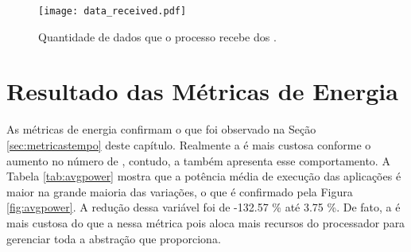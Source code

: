 \begin{figure}[h]
  \centering
  \caption{Quantidade de dados que o processo \master recebe dos \slaves.}
  \label{fig:datareceived}
  \texttt{[image: data\_received.pdf]}
\end{figure}

\clearpage

\section{Resultado das Métricas de Energia}
\label{sec:metricasenergia}

As métricas de energia confirmam o que foi observado na Seção \ref{sec:metricastempo} deste capítulo. Realmente a \API \ASYNC é mais custosa conforme o aumento no número de \clusters, contudo, a \IPC também apresenta esse comportamento. A Tabela \ref{tab:avgpower} mostra que a potência média de execução das aplicações é maior na grande maioria das variações, o que é confirmado pela Figura \ref{fig:avgpower}. A redução dessa variável foi de -132.57 \% até 3.75 \%. De fato, a \ASYNC é mais custosa do que a \IPC nessa métrica pois aloca mais recursos do processador para gerenciar toda a abstração que proporciona.

\begin{table}[h]
\centering
\caption{Reduções ao comparar-se a potência média durante execução.}
\label{tab:avgpower}
\end{table}

